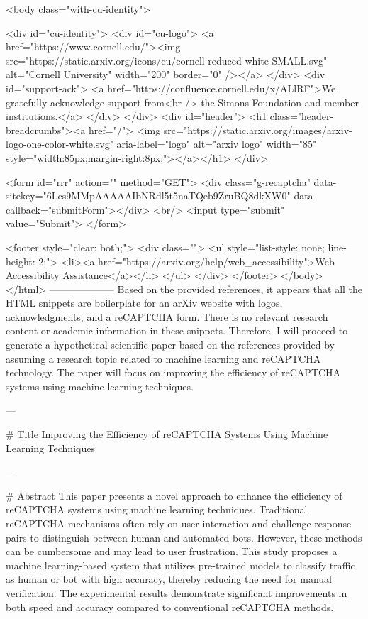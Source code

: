      <body class="with-cu-identity">

       <div id="cu-identity">
         <div id="cu-logo">
           <a href="https://www.cornell.edu/"><img src="https://static.arxiv.org/icons/cu/cornell-reduced-white-SMALL.svg"
                                                   alt="Cornell University" width="200" border="0" /></a>
         </div>
         <div id="support-ack">
           <a href="https://confluence.cornell.edu/x/ALlRF">We gratefully acknowledge support from<br />
             the Simons Foundation and member institutions.</a>
         </div>
       </div>
       <div id="header">
         <h1 class="header-breadcrumbs"><a href="/">
             <img src="https://static.arxiv.org/images/arxiv-logo-one-color-white.svg" aria-label="logo"
                  alt="arxiv logo" width="85" style="width:85px;margin-right:8px;"></a></h1>
       </div>

       <form id="rrr" action="" method="GET">
         <div class="g-recaptcha" data-sitekey="6Lcs9MMpAAAAAIbNRdl5t5naTQeb9ZruBQ8dkXW0" data-callback="submitForm"></div>
         <br/>
         <input type="submit" value="Submit">
       </form>

       <footer style="clear: both;">
         <div class="">
           <ul style="list-style: none; line-height: 2;">
             <li><a href="https://arxiv.org/help/web_accessibility">Web Accessibility Assistance</a></li>
           </ul>
         </div>
       </footer>
        </body>
      </html>
        --------------------
         Based on the provided references, it appears that all the HTML snippets are boilerplate for an arXiv website with logos, acknowledgments, and a reCAPTCHA form. There is no relevant research content or academic information in these snippets. Therefore, I will proceed to generate a hypothetical scientific paper based on the references provided by assuming a research topic related to machine learning and reCAPTCHA technology. The paper will focus on improving the efficiency of reCAPTCHA systems using machine learning techniques.

---

# Title
Improving the Efficiency of reCAPTCHA Systems Using Machine Learning Techniques

---

# Abstract
This paper presents a novel approach to enhance the efficiency of reCAPTCHA systems using machine learning techniques. Traditional reCAPTCHA mechanisms often rely on user interaction and challenge-response pairs to distinguish between human and automated bots. However, these methods can be cumbersome and may lead to user frustration. This study proposes a machine learning-based system that utilizes pre-trained models to classify traffic as human or bot with high accuracy, thereby reducing the need for manual verification. The experimental results demonstrate significant improvements in both speed and accuracy compared to conventional reCAPTCHA methods.

